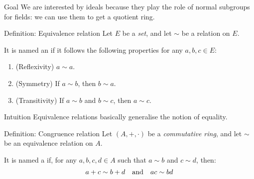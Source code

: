\documentclass[a4paper]{article}
\begin{document}
\begin{parag}{Goal}
    We are interested by ideals because they play the role of normal subgroups for fields: we can use them to get a quotient ring.
\end{parag}


\begin{parag}{Definition: Equivalence relation}
    Let $E$ be a \textit{set}, and let $\sim$ be a relation on $E$.

    It is named an  if it follows the following properties for any $a, b, c \in E$:
    \begin{enumerate}
        \item (Reflexivity) $a \sim a$.
        \item (Symmetry) If $a \sim b$, then $b \sim a$.
        \item (Transitivity) If $a\sim b$ and $b \sim c$, then $a \sim c$.
    \end{enumerate}
    
    \begin{subparag}{Intuition}
        Equivalence relations basically generalise the notion of equality.
    \end{subparag}
\end{parag}

\begin{parag}{Definition: Congruence relation}
    Let $\left(A, + , \cdot \right)$ be a \textit{commutative ring}, and let $\sim$ be an equivalence relation on $A$.

    It is named a  if, for any $a, b, c, d \in A$ such that $a \sim b$ and $c \sim d$, then: 
    \[a + c \sim b + d \quad \text{and} \quad ac \sim bd\]
\end{parag}
\end{document}
